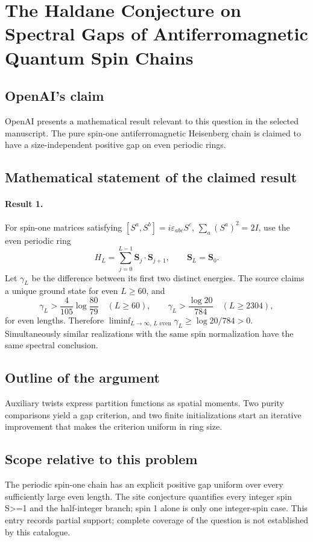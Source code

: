 \documentclass[11pt]{article}
\begin{document}
\section*{The Haldane Conjecture on Spectral Gaps of Antiferromagnetic Quantum Spin Chains}

\subsection{OpenAI's claim}
OpenAI presents a mathematical result relevant to this question in the selected manuscript. The pure spin-one antiferromagnetic Heisenberg chain is claimed to have a size-independent positive gap on even periodic rings.

\subsection{Mathematical statement of the claimed result}
\paragraph{Result 1.} For spin-one matrices satisfying \([S^a,S^b]=i\varepsilon_{abc}S^c\), \(\sum_a(S^a)^2=2I\), use the even periodic ring
\[
 H_L=\sum_{j=0}^{L-1}\boldsymbol S_j\cdot\boldsymbol S_{j+1},\qquad\boldsymbol S_L=\boldsymbol S_0.
\]
Let \(\gamma_L\) be the difference between its first two distinct energies. The source claims a unique ground state for even \(L\ge60\), and
\[
 \gamma_L>\frac4{105}\log\frac{80}{79}\quad(L\ge60),\qquad
 \gamma_L>\frac{\log20}{784}\quad(L\ge2304),
\]
for even lengths. Therefore \(\liminf_{L\to\infty,\ L\text{ even}}\gamma_L\ge\log20/784>0\). Simultaneously similar realizations with the same spin normalization have the same spectral conclusion.

\subsection{Outline of the argument}
Auxiliary twists express partition functions as spatial moments. Two purity comparisons yield a gap criterion, and two finite initializations start an iterative improvement that makes the criterion uniform in ring size.

\subsection{Scope relative to this problem}
The periodic spin-one chain has an explicit positive gap uniform over every sufficiently large even length. The site conjecture quantifies every integer spin S>=1 and the half-integer branch; spin 1 alone is only one integer-spin case. This entry records partial support; complete coverage of the question is not established by this catalogue.
\end{document}
